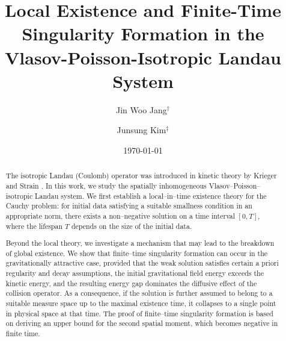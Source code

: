 \documentclass[reqno,11pt,final]{amsart}
\title[Local Existence and Singularity Formation for Vlasov–Poisson–Isotropic Landau]{Local Existence and Finite-Time Singularity Formation in the Vlasov-Poisson-Isotropic Landau System}
\author[J. W. Jang]{Jin Woo Jang$^\dagger$}
\author[J. Kim]{Junsung Kim$^\ddagger$}
\theoremstyle{plain}
\numberwithin{equation}{section}
\numberwithin{theorem}{section}
\begin{document}

\date{\today}\begin{abstract}
The isotropic Landau (Coulomb) operator was introduced in kinetic theory by Krieger and Strain \cite{iL_KS_2012}. In this work, we study the spatially inhomogeneous Vlasov--Poisson--isotropic Landau system. We first establish a local--in--time existence theory for the Cauchy problem: for initial data satisfying a suitable smallness condition in an appropriate norm, there exists a non--negative solution on a time interval $[0,T]$, where the lifespan $T$ depends on the size of the initial data.

Beyond the local theory, we investigate a mechanism that may lead to the breakdown of global existence. We show that finite--time singularity formation can occur in the gravitationally attractive case, provided that the weak solution satisfies certain a priori regularity and decay assumptions, the initial gravitational field energy exceeds the kinetic energy, and the resulting energy gap dominates the diffusive effect of the collision operator. As a consequence, if the solution is further assumed to belong to a suitable measure space up to the maximal existence time, it collapses to a single point in physical space at that time. The proof of finite--time singularity formation is based on deriving an upper bound for the second spatial moment, which becomes negative in finite time.
\end{abstract}


\setcounter{tocdepth}{2}







\maketitle
\tableofcontents
\thispagestyle{empty}
\end{document}
